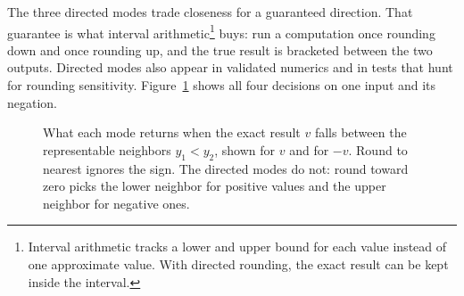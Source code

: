 \documentclass[manuscript, nonacm]{acmart}
\begin{document}
    The three directed modes trade closeness for a guaranteed direction. That
    guarantee is what interval arithmetic\footnote{Interval arithmetic tracks a lower and upper bound for each value instead of one approximate value. With directed rounding, the exact result can be kept inside the interval.} buys: run a computation
    once rounding down and once rounding up, and the true result is bracketed
    between the two outputs. Directed modes also appear in validated
    numerics and in tests that hunt for rounding sensitivity.
    Figure~\ref{fig:roundingmodes} shows all four decisions on one input and
    its negation.

    \begin{figure}[tbp]
        \centering
        \caption{What each mode returns when the exact result $v$ falls between
        the representable neighbors $y_1 < y_2$, shown for $v$ and for $-v$.
        Round to nearest ignores the sign. The directed modes do not: round
        toward zero picks the lower neighbor for positive values and the upper
        neighbor for negative ones.}
        \label{fig:roundingmodes}
    \end{figure}
\end{document}
